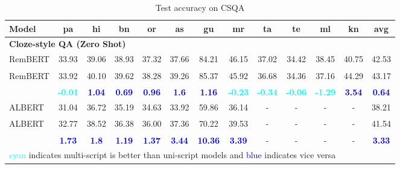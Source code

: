 \documentclass[11pt]{article}
\begin{document}
\begin{table*}[hbt!]
\begin{center}
\begin{adjustbox}{max width=0.8\textwidth}
\small
\begin{tabular}{l c c c c c c c c c c c c}
\toprule[2pt]
\textbf{Model} & \textbf{pa} & \textbf{hi} & \textbf{bn} & \textbf{or} & \textbf{as} & \textbf{gu} & \textbf{mr} & \textbf{ta} & \textbf{te} & \textbf{ml} & \textbf{kn} & \textbf{avg}\\ 
\midrule[2pt]
\multicolumn{13}{l}{\textbf{Cloze-style QA (Zero Shot)}}\\
RemBERT\textsubscript{}  & 33.93 & 39.06 & 38.93 & 37.32 & 37.66 & 84.21 & 46.15 & 37.02 & 34.42 & 38.45 & 40.75 & 42.53 \\
RemBERT\textsubscript{}  & 33.92 & 40.10 & 39.62 & 38.28 & 39.26 & 85.37 & 45.92 & 36.68 & 34.36 & 37.16 & 44.29 & 43.17 \\
 & \textcolor{cyan}{\textbf{-0.01}} & \textcolor{blue}{\textbf{1.04}} & \textcolor{blue}{\textbf{0.69}} & \textcolor{blue}{\textbf{0.96}} & \textcolor{blue}{\textbf{1.6}} & \textcolor{blue}{\textbf{1.16}} & \textcolor{cyan}{\textbf{-0.23}} & \textcolor{cyan}{\textbf{-0.34}} & \textcolor{cyan}{\textbf{-0.06}} & \textcolor{cyan}{\textbf{-1.29}} & \textcolor{blue}{\textbf{3.54}} & \textcolor{blue}{\textbf{0.64}} \\
\midrule[1pt]
ALBERT\textsubscript{}           & 31.04    & 36.72  & 35.19  & 34.63  & 33.92  & 59.86  & 36.14 & - & - & - & - & 38.21  \\
ALBERT\textsubscript{}  &  32.77& 38.52& 36.38& 36.00& 37.36& 70.22& 39.53& - & - & - & - & 41.54  \\
 & \textcolor{blue}{\textbf{1.73}} & \textcolor{blue}{\textbf{1.8}} & \textcolor{blue}{\textbf{1.19}} & \textcolor{blue}{\textbf{1.37}} & \textcolor{blue}{\textbf{3.44}} & \textcolor{blue}{\textbf{10.36}} & \textcolor{blue}{\textbf{3.39}} & - & - & - & - & \textcolor{blue}{\textbf{3.33}}  \\
\bottomrule[2pt]
\multicolumn{13}{l}{\textcolor{cyan}{cyan} indicates multi-script is better than uni-script models and \textcolor{blue}{blue} indicates vice versa}
\end{tabular}
\end{adjustbox}
\caption{Test accuracy on CSQA}
\label{table-res-csqa}
\end{center}
\end{table*}
\end{document}
